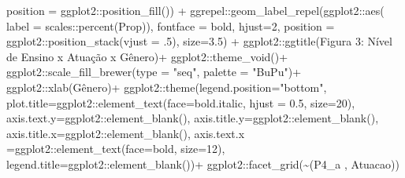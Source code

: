 \documentclass[
]{article}
\newenvironment{Shaded}{\begin{snugshade}}{\end{snugshade}}
\newcommand{\AttributeTok}[1]{\textcolor[rgb]{0.77,0.63,0.00}{#1}}
\newcommand{\DecValTok}[1]{\textcolor[rgb]{0.00,0.00,0.81}{#1}}
\newcommand{\FloatTok}[1]{\textcolor[rgb]{0.00,0.00,0.81}{#1}}
\newcommand{\FunctionTok}[1]{\textcolor[rgb]{0.00,0.00,0.00}{#1}}
\newcommand{\NormalTok}[1]{#1}
\newcommand{\SpecialCharTok}[1]{\textcolor[rgb]{0.00,0.00,0.00}{#1}}
\newcommand{\StringTok}[1]{\textcolor[rgb]{0.31,0.60,0.02}{#1}}
\begin{document}
\begin{Shaded}
\begin{Highlighting}[]
                     \AttributeTok{position =}\NormalTok{ ggplot2}\SpecialCharTok{::}\FunctionTok{position\_fill}\NormalTok{()) }\SpecialCharTok{+}
\NormalTok{  ggrepel}\SpecialCharTok{::}\FunctionTok{geom\_label\_repel}\NormalTok{(ggplot2}\SpecialCharTok{::}\FunctionTok{aes}\NormalTok{(}
    \AttributeTok{label =}\NormalTok{ scales}\SpecialCharTok{::}\FunctionTok{percent}\NormalTok{(Prop)),}
    \AttributeTok{fontface =} \StringTok{\textquotesingle{}bold\textquotesingle{}}\NormalTok{,}
    \AttributeTok{hjust=}\DecValTok{2}\NormalTok{,}
    \AttributeTok{position =}\NormalTok{ ggplot2}\SpecialCharTok{::}\FunctionTok{position\_stack}\NormalTok{(}\AttributeTok{vjust =}\NormalTok{ .}\DecValTok{5}\NormalTok{),}
    \AttributeTok{size=}\FloatTok{3.5}\NormalTok{) }\SpecialCharTok{+}
\NormalTok{  ggplot2}\SpecialCharTok{::}\FunctionTok{ggtitle}\NormalTok{(}\StringTok{\textquotesingle{}Figura 3: Nível de Ensino x Atuação x Gênero\textquotesingle{}}\NormalTok{)}\SpecialCharTok{+}
\NormalTok{  ggplot2}\SpecialCharTok{::}\FunctionTok{theme\_void}\NormalTok{()}\SpecialCharTok{+}
\NormalTok{  ggplot2}\SpecialCharTok{::}\FunctionTok{scale\_fill\_brewer}\NormalTok{(}\AttributeTok{type =} \StringTok{"seq"}\NormalTok{, }\AttributeTok{palette =} \StringTok{"BuPu"}\NormalTok{)}\SpecialCharTok{+}
\NormalTok{  ggplot2}\SpecialCharTok{::}\FunctionTok{xlab}\NormalTok{(}\StringTok{\textquotesingle{}Gênero\textquotesingle{}}\NormalTok{)}\SpecialCharTok{+}
\NormalTok{  ggplot2}\SpecialCharTok{::}\FunctionTok{theme}\NormalTok{(}\AttributeTok{legend.position=}\StringTok{"bottom"}\NormalTok{,}
                 \AttributeTok{plot.title=}\NormalTok{ggplot2}\SpecialCharTok{::}\FunctionTok{element\_text}\NormalTok{(}\AttributeTok{face=}\StringTok{\textquotesingle{}bold.italic\textquotesingle{}}\NormalTok{,}
                                                  \AttributeTok{hjust =} \FloatTok{0.5}\NormalTok{, }\AttributeTok{size=}\DecValTok{20}\NormalTok{),}
                 \AttributeTok{axis.text.y=}\NormalTok{ggplot2}\SpecialCharTok{::}\FunctionTok{element\_blank}\NormalTok{(),}
                 \AttributeTok{axis.title.y=}\NormalTok{ggplot2}\SpecialCharTok{::}\FunctionTok{element\_blank}\NormalTok{(),}
                 \AttributeTok{axis.title.x=}\NormalTok{ggplot2}\SpecialCharTok{::}\FunctionTok{element\_blank}\NormalTok{(),}
                 \AttributeTok{axis.text.x =}\NormalTok{ggplot2}\SpecialCharTok{::}\FunctionTok{element\_text}\NormalTok{(}\AttributeTok{face=}\StringTok{\textquotesingle{}bold\textquotesingle{}}\NormalTok{, }\AttributeTok{size=}\DecValTok{12}\NormalTok{),}
                 \AttributeTok{legend.title=}\NormalTok{ggplot2}\SpecialCharTok{::}\FunctionTok{element\_blank}\NormalTok{())}\SpecialCharTok{+}
\NormalTok{  ggplot2}\SpecialCharTok{::}\FunctionTok{facet\_grid}\NormalTok{(}\SpecialCharTok{\textasciitilde{}}\StringTok{\textasciigrave{}}\AttributeTok{(\textquotesingle{}P4\_a \textquotesingle{}, \textquotesingle{}Atuacao\textquotesingle{})}\StringTok{\textasciigrave{}}\NormalTok{)}
\end{Highlighting}
\end{Shaded}
\end{document}
